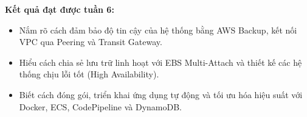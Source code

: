 \vspace{0.5em}\noindent\textbf{Kết quả đạt được tuần
6:}\par

\begin{itemize}
\tightlist
\item
  Nắm rõ cách đảm bảo độ tin cậy của hệ thống bằng AWS Backup, kết nối
  VPC qua Peering và Transit Gateway.
\item
  Hiểu cách chia sẻ lưu trữ linh hoạt với EBS Multi-Attach và thiết kế
  các hệ thống chịu lỗi tốt (High Availability).
\item
  Biết cách đóng gói, triển khai ứng dụng tự động và tối ưu hóa hiệu
  suất với Docker, ECS, CodePipeline và DynamoDB.
\end{itemize}
